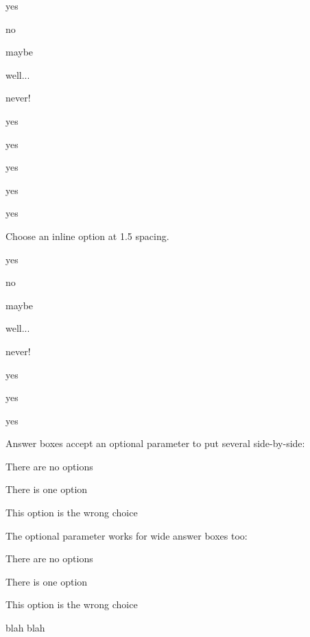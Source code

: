 \documentclass{ouicma}
\begin{document}
\begin{inlineoptions}{5}%
\item yes
\item no
\item maybe
\item well...
\item never!
\item yes
\item yes
\item yes
\item yes
\item yes\answerbox
\end{inlineoptions}

\question
Choose an inline option at 1.5 spacing.
\begin{inlineoptions}[1.5]{3} %
\item yes
\item no
\item maybe
\item well...
\item never!
\item yes
\item yes
\item yes
\noitem %
\end{inlineoptions}

\question
Answer boxes accept an optional parameter to put several side-by-side:
\begin{options}
\item There are no options
\item There is one option
\item This option is the wrong choice\answerbox[4]
\end{options}


\question
The optional parameter works for wide answer boxes too:
\begin{options}
\item There are no options
\item There is one option
\item This option is the wrong choice\wideanswerbox[2]
\end{options}

blah blah 
\end{document}

